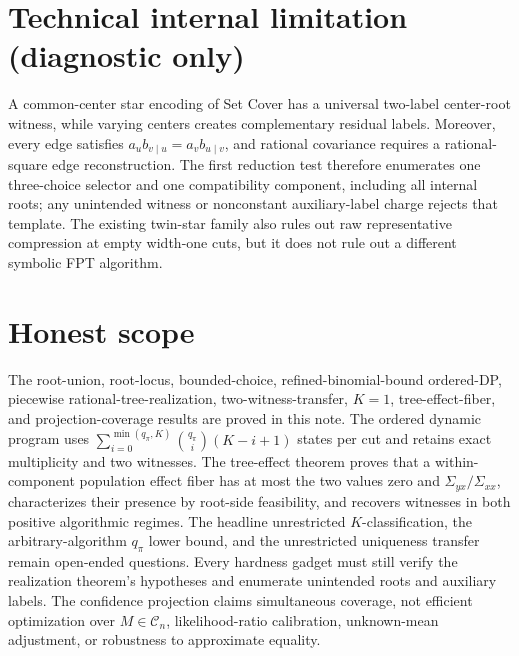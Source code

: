 \documentclass{article}
\begin{document}
\section*{Technical internal limitation (diagnostic only)}

A common-center star encoding of Set Cover has a universal two-label center-root witness, while varying centers creates complementary residual labels. Moreover, every edge satisfies \(a_u b_{v\mid u}=a_v b_{u\mid v}\), and rational covariance requires a rational-square edge reconstruction. The first reduction test therefore enumerates one three-choice selector and one compatibility component, including all internal roots; any unintended witness or nonconstant auxiliary-label charge rejects that template. The existing twin-star family also rules out raw representative compression at empty width-one cuts, but it does not rule out a different symbolic FPT algorithm.

\section{Honest scope}

The root-union, root-locus, bounded-choice, refined-binomial-bound ordered-DP, piecewise rational-tree-realization, two-witness-transfer, \(K=1\), tree-effect-fiber, and projection-coverage results are proved in this note. The ordered dynamic program uses \(\sum_{i=0}^{\min(q_\pi,K)}\binom{q_\pi}{i}(K-i+1)\) states per cut and retains exact multiplicity and two witnesses. The tree-effect theorem proves that a within-component population effect fiber has at most the two values zero and \(\Sigma_{yx}/\Sigma_{xx}\), characterizes their presence by root-side feasibility, and recovers witnesses in both positive algorithmic regimes. The headline unrestricted \(K\)-classification, the arbitrary-algorithm \(q_\pi\) lower bound, and the unrestricted uniqueness transfer remain open-ended questions. Every hardness gadget must still verify the realization theorem's hypotheses and enumerate unintended roots and auxiliary labels. The confidence projection claims simultaneous coverage, not efficient optimization over \(M\in\mathcal C_n\), likelihood-ratio calibration, unknown-mean adjustment, or robustness to approximate equality.
\end{document}
